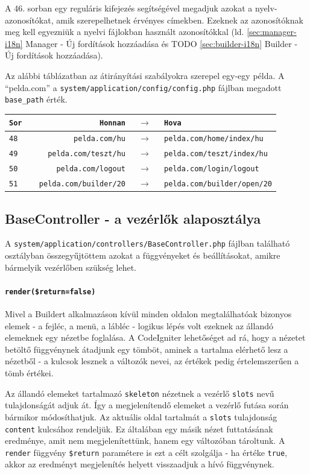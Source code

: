 \documentclass[12pt,a4paper,twoside]{article}
\begin{document}
A 46. sorban egy reguláris kifejezés segítségével megadjuk azokat a
nyelv-azonosítókat, amik szerepelhetnek érvényes címekben. Ezeknek az
azonosítóknak meg kell egyezniük a nyelvi fájlokban használt azonosítókkal
(ld. \ref{sec:manager-i18n} Manager - Új fordítások hozzáadása és
TODO \ref{sec:builder-i18n} Builder - Új fordítások hozzáadása).

Az alábbi táblázatban az átirányítási szabályokra szerepel egy-egy példa. A
``pelda.com'' a \texttt{system/application/config/config.php} fájlban megadott
\texttt{base\_path} érték.

\begin{tabular*}{\textwidth}{>{\tt}l|>{\tt}r>{$\rightarrow$}c>{\tt}l}
  \rm Sor & \rm Honnan           & & \rm Hova        \\
  \hline
  48      & pelda.com/hu         & & pelda.com/home/index/hu  \\
  49      & pelda.com/teszt/hu   & & pelda.com/teszt/index/hu \\
  50      & pelda.com/logout     & & pelda.com/login/logout   \\
  51      & pelda.com/builder/20 & & pelda.com/builder/open/20
\end{tabular*}


\subsection{BaseController - a vezérlők alaposztálya}

A \texttt{system/application/controllers/BaseController.php} fájlban található
osztályban összegyűjtöttem azokat a függvényeket és beállításokat, amikre
bármelyik vezérlőben szükség lehet.

\paragraph{\texttt{render(\$return=false)}}
Mivel a Buildert alkalmazáson kívül minden oldalon megtalálhatóak bizonyos
elemek - a fejléc, a menü, a lábléc - logikus lépés volt ezeknek az állandó
elemeknek egy nézetbe foglalása. A CodeIgniter lehetőséget ad rá, hogy a
nézetet betöltő függvénynek átadjunk egy tömböt, aminek a tartalma elérhető lesz
a nézetből - a kulcsok lesznek a változók nevei, az értékek pedig értelemszerűen
a tömb értékei.

Az állandó elemeket tartalmazó \texttt{skeleton} nézetnek a vezérlő
\texttt{slots} nevű tulajdonságát adjuk át. Így a megjelenítendő elemeket a
vezérlő futása során bármikor módosíthatjuk. Az aktuális oldal tartalmát a
\texttt{slots} tulajdonság \texttt{content} kulcsához rendeljük. Ez általában
egy másik nézet futtatásának eredménye, amit nem megjelenítettünk, hanem egy
változóban tároltunk. A \texttt{render} függvény \texttt{\$return} paramétere is
ezt a célt szolgálja - ha értéke \texttt{true}, akkor az eredményt megjelenítés
helyett visszaadjuk a hívó függvénynek.
\end{document}
